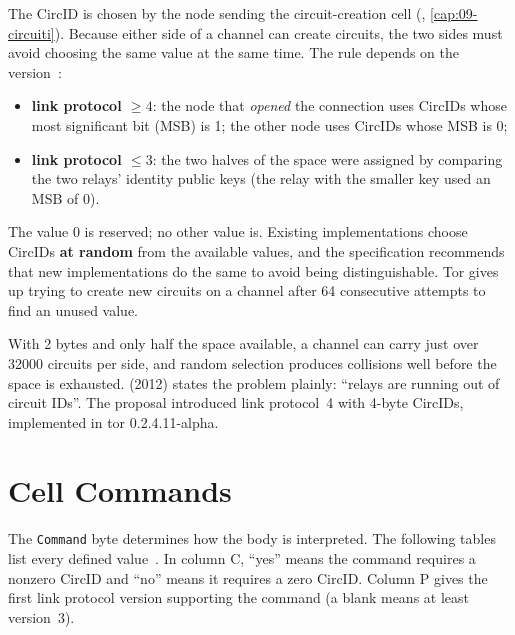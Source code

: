 The CircID is chosen by the node sending the circuit-creation cell (, \cref{cap:09-circuiti}). Because either side of a channel can create circuits, the two sides must avoid choosing the same value at the same time. The rule depends on the version~:
\begin{itemize}
  \item \textbf{link protocol $\ge 4$}: the node that \emph{opened} the connection uses CircIDs whose most significant bit (MSB) is 1; the other node uses CircIDs whose MSB is 0;
  \item \textbf{link protocol $\le 3$}: the two halves of the space were assigned by comparing the two relays' identity public keys (the relay with the smaller key used an MSB of 0).
\end{itemize}
The value 0 is reserved; no other value is. Existing implementations choose CircIDs \textbf{at random} from the available values, and the specification recommends that new implementations do the same to avoid being distinguishable. Tor gives up trying to create new circuits on a channel after 64 consecutive attempts to find an unused value.

\begin{approfondimento}
With 2 bytes and only half the space available, a channel can carry just over \num{32000} circuits per side, and random selection produces collisions well before the space is exhausted.  (2012) states the problem plainly: \enquote{relays are running out of circuit IDs}. The proposal introduced link protocol~4 with 4-byte CircIDs, implemented in tor 0.2.4.11-alpha.
\end{approfondimento}

\section{Cell Commands}\label{sec:comandi}

The \texttt{Command} byte determines how the body is interpreted. The following tables list every defined value~. In column C, \enquote{yes} means the command requires a nonzero CircID and \enquote{no} means it requires a zero CircID. Column P gives the first link protocol version supporting the command (a blank means at least version~3).


